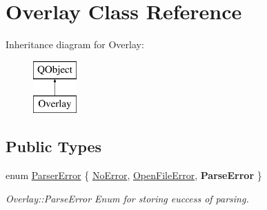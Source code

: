\hypertarget{classOverlay}{}\section{Overlay Class Reference}
\label{classOverlay}
Inheritance diagram for Overlay\+:\begin{figure}[H]
\begin{center}
\leavevmode
\includegraphics[height=2.000000cm]{classOverlay}
\end{center}
\end{figure}
\subsection*{Public Types}
\begin{DoxyCompactItemize}
\item 
enum \hyperlink{classOverlay_a9ef00f03a1372dc5bf0ae9b399c18193}{Parser\+Error} \{ \hyperlink{classOverlay_a9ef00f03a1372dc5bf0ae9b399c18193ae7066bd6638ef675ab94e1c083cb1bd0}{No\+Error}, 
\hyperlink{classOverlay_a9ef00f03a1372dc5bf0ae9b399c18193a1784694bdc240ab419e6178291eaa399}{Open\+File\+Error}, 
{\bfseries Parse\+Error}
 \}\begin{DoxyCompactList}\small\item\em Overlay\+::\+Parse\+Error Enum for storing euccess of parsing. \end{DoxyCompactList}
\end{DoxyCompactItemize}
